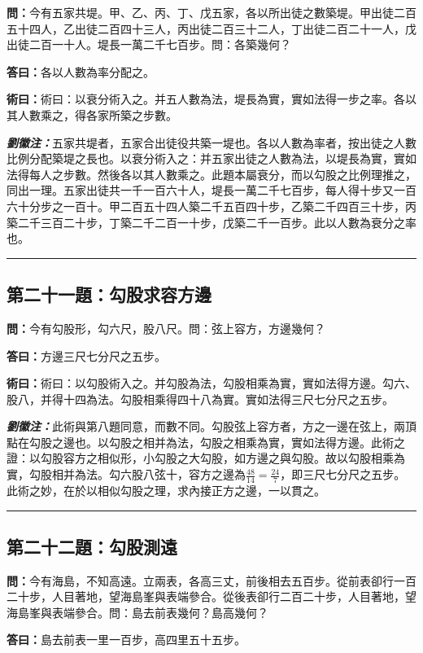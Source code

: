 \documentclass[11pt,a4paper]{article}
\newcommand{\wen}[1]{\textbf{\color{problemcolor}問：}#1\par}
\newcommand{\da}[1]{\textbf{答曰：}#1\par}
\newcommand{\shu}[1]{\textbf{術曰：}#1\par}
\newcommand{\liuhui}[1]{{\color{commentarycolor}\textit{\textbf{劉徽注：}}#1\par}}
\begin{document}
\wen{今有五家共堤。甲、乙、丙、丁、戊五家，各以所出徒之數築堤。甲出徒二百五十四人，乙出徒二百四十三人，丙出徒二百三十二人，丁出徒二百二十一人，戊出徒二百一十人。堤長一萬二千七百步。問：各築幾何？}

\da{各以人數為率分配之。}

\shu{術曰：以衰分術入之。并五人數為法，堤長為實，實如法得一步之率。各以其人數乘之，得各家所築之步數。}

\liuhui{五家共堤者，五家合出徒役共築一堤也。各以人數為率者，按出徒之人數比例分配築堤之長也。以衰分術入之：并五家出徒之人數為法，以堤長為實，實如法得每人之步數。然後各以其人數乘之。此題本屬衰分，而以勾股之比例理推之，同出一理。五家出徒共一千一百六十人，堤長一萬二千七百步，每人得十步又一百六十分步之一百十。甲二百五十四人築二千五百四十步，乙築二千四百三十步，丙築二千三百二十步，丁築二千二百一十步，戊築二千一百步。此以人數為衰分之率也。}

\bigskip
\hrule
\bigskip

\subsection{第二十一題：勾股求容方邊}

\wen{今有勾股形，勾六尺，股八尺。問：弦上容方，方邊幾何？}

\da{方邊三尺七分尺之五步。}

\shu{術曰：以勾股術入之。并勾股為法，勾股相乘為實，實如法得方邊。勾六、股八，并得十四為法。勾股相乘得四十八為實。實如法得三尺七分尺之五步。}

\liuhui{此術與第八題同意，而數不同。勾股弦上容方者，方之一邊在弦上，兩頂點在勾股之邊也。以勾股之相并為法，勾股之相乘為實，實如法得方邊。此術之證：以勾股容方之相似形，小勾股之大勾股，如方邊之與勾股。故以勾股相乘為實，勾股相并為法。勾六股八弦十，容方之邊為$\frac{48}{14} = \frac{24}{7}$，即三尺七分尺之五步。此術之妙，在於以相似勾股之理，求內接正方之邊，一以貫之。}

\bigskip
\hrule
\bigskip

\subsection{第二十二題：勾股測遠}

\wen{今有海島，不知高遠。立兩表，各高三丈，前後相去五百步。從前表卻行一百二十步，人目著地，望海島峯與表端參合。從後表卻行二百二十步，人目著地，望海島峯與表端參合。問：島去前表幾何？島高幾何？}

\da{島去前表一里一百步，高四里五十五步。}
\end{document}
